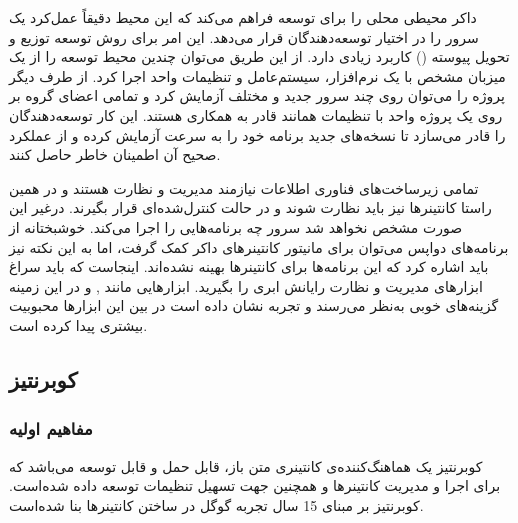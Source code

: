 داکر محیطی محلی را برای توسعه فراهم می‌کند که این محیط دقیقاً عمل‌کرد یک سرور را در اختیار توسعه‌دهندگان قرار می‌دهد. این امر برای روش توسعه توزیع و تحویل پیوسته () کاربرد زیادی دارد. از این طریق می‌توان چندین محیط توسعه را از یک میزبان مشخص با یک نرم‌افزار، سیستم‌عامل و تنظیمات واحد اجرا کرد. از طرف دیگر پروژه‌ را می‌توان روی چند سرور جدید و مختلف آزمایش کرد و تمامی اعضای گروه بر روی یک پروژه‌ واحد با تنظیمات همانند قادر به همکاری هستند. این کار توسعه‌دهندگان را قادر می‌سازد تا نسخه‌های جدید برنامه خود را به سرعت آزمایش کرده و از عملکرد صحیح آن اطمینان خاطر حاصل کنند.

تمامی زیرساخت‌های فناوری اطلاعات نیازمند مدیریت و نظارت هستند و در همین راستا کانتینرها نیز باید نظارت شوند و در حالت کنترل‌شده‌ای قرار بگیرند. درغیر این‌ صورت مشخص نخواهد شد سرور چه برنامه‌هایی را اجرا می‌کند. خوشبختانه از برنامه‌های دواپس می‌توان برای مانیتور کانتینرهای داکر کمک گرفت، اما به این نکته نیز باید اشاره کرد که این برنامه‌ها برای کانتینرها بهینه‌ نشده‌اند. اینجاست که باید سراغ ابزارهای مدیریت و نظارت رایانش ابری را بگیرید. ابزارهایی مانند ,  و  در این زمینه گزینه‌های خوبی به‌نظر می‌رسند و تجربه نشان داده است در بین این ابزارها  محبوبیت بیشتری پیدا کرده است.
\cite{nichols_2018}

\subsection{کوبرنتیز}

\subsubsection{مفاهیم اولیه}

کوبرنتیز یک هماهنگ‌کننده‌ی کانتینری متن باز، قابل حمل و قابل توسعه می‌باشد که برای اجرا و مدیریت کانتینرها و همچنین جهت تسهیل تنظیمات توسعه داده شده‌است. کوبرنتیز بر مبنای 15 سال تجربه گوگل در ساختن کانتینرها بنا شده‌است.

